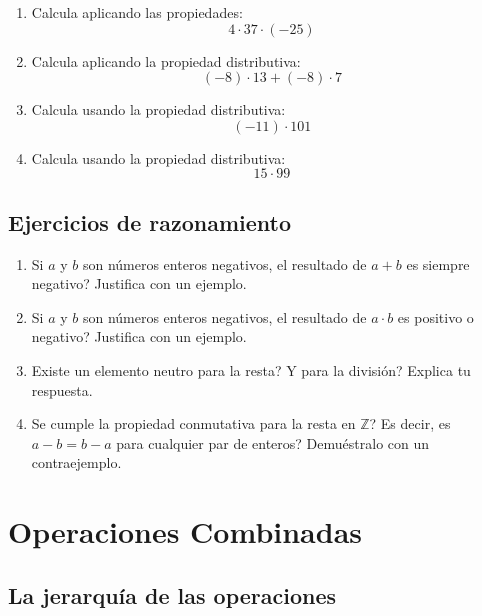 \documentclass[12pt, letterpaper]{article}
\newcommand{\Z}{\mathbb{Z}}
\begin{document}
\begin{enumerate}[leftmargin=*, start=75]
  \item \dificil{} Calcula aplicando las propiedades:
        \[
          4 \cdot 37 \cdot (-25)
        \]

  \item \dificil{} Calcula aplicando la propiedad distributiva:
        \[
          (-8) \cdot 13 + (-8) \cdot 7
        \]

  \item \dificil{} Calcula usando la propiedad distributiva:
        \[
          (-11) \cdot 101
        \]

  \item \dificil{} Calcula usando la propiedad distributiva:
        \[
          15 \cdot 99
        \]
\end{enumerate}

\subsection{Ejercicios de razonamiento}

\begin{enumerate}[leftmargin=*, start=90]
  \item \dificil{} Si $a$ y $b$ son números enteros negativos, \textquestiondown el resultado de $a + b$ es siempre negativo? Justifica con un ejemplo.

  \item \dificil{} Si $a$ y $b$ son números enteros negativos, \textquestiondown el resultado de $a \cdot b$ es positivo o negativo? Justifica con un ejemplo.

  \item \dificil{} \textquestiondown Existe un elemento neutro para la resta? \textquestiondown Y para la división? Explica tu respuesta.

  \item \dificil{} \textquestiondown Se cumple la propiedad conmutativa para la resta en $\Z$? Es decir, \textquestiondown es $a - b = b - a$ para cualquier par de enteros? Demuéstralo con un contraejemplo.
\end{enumerate}

\newpage

\section{Operaciones Combinadas}

\subsection{La jerarquía de las operaciones}
\end{document}
